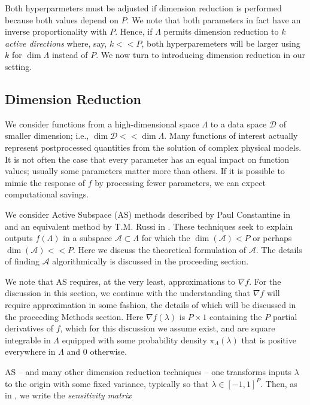 \documentclass{amsart}
\newcommand{\D}{\mathcal{D}}
\newcommand{\A}{\mathcal{A}}
\begin{document}
Both hyperparmeters must be adjusted if dimension reduction is performed because both values depend on $P$. We note that both parameters in fact have an inverse proportionality with $P$. Hence, if $\Lambda$ permits dimension reduction to $k$ \textit{active directions} where, say, $k<<P$, both hyperparemeters will be larger using $k$ for $\dim \Lambda$ instead of $P.$ We now turn to introducing dimension reduction in our setting.





\subsection{Dimension Reduction}
We consider functions from a high-dimensional space $\Lambda$ to a data space $\D$ of smaller dimension; i.e., $\dim \D << \dim \Lambda$. Many functions of interest
actually represent postprocessed quantities from the solution of complex physical models. 
It is not often the case that every parameter has an equal impact on function values; usually some parameters matter more than others. If it is possible to mimic the response of $f$ by processing fewer parameters, we can expect computational savings.

We consider Active Subspace (AS) methods described by Paul Constantine in \cite{Constantine2015} and an equivalent method by T.M. Russi in \cite{Russi}. These techniques seek to explain outputs $f(\Lambda)$ in a subspace $\A \subset \Lambda$ for which the $\dim (\A) <P$ or perhaps $\dim(\A)<<P$. Here we discuss the theoretical formulation of $\A$. The details of finding $\A$ algorithmically is discussed in the proceeding section.

We note that AS requires, at the very least, approximations to $\nabla f$. For the discussion in this section, we continue with the understanding that $\nabla f$ will require approximation in some fashion, the details of which will be discussed in the proceeding Methods section. Here $\nabla f(\lambda)$ is $P\times 1$ containing the $P$ partial derivatives of $f$, which for this discussion we assume exist, and are square integrable in $\Lambda$ equipped with some probability density $\pi_\Lambda(\lambda)$ that is positive everywhere in $\Lambda$ and 0 otherwise.
 
AS -- and many other dimension reduction techniques \cite{Russi} -- one transforms inputs $\lambda$ to the origin with some fixed variance, typically so that $\lambda\in [-1,1]^P$. Then, as in \cite{ConstantineMC}, we write the \textit{sensitivity matrix}
\end{document}
